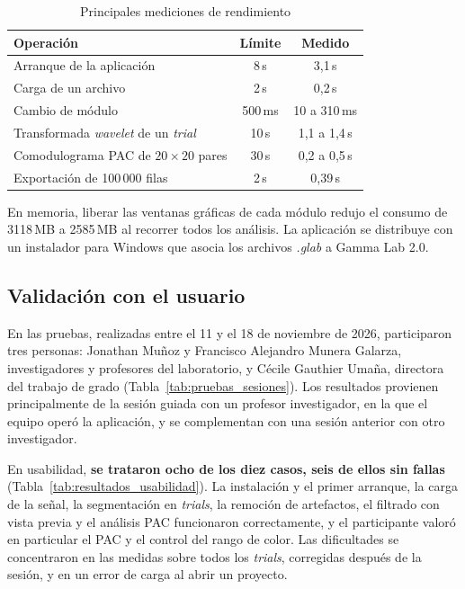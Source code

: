 \documentclass[12pt,letterpaper,oneside]{article}
\begin{document}
\begin{table}[H]
\centering
\scriptsize
\renewcommand{\arraystretch}{1.3}
\begin{tabularx}{\textwidth}{|>{\raggedright\arraybackslash}X|c|c|}
\hline
\textbf{Operación} & \textbf{Límite} & \textbf{Medido} \\
\hline
Arranque de la aplicación & 8\,s & 3,1\,s \\
\hline
Carga de un archivo & 2\,s & 0,2\,s \\
\hline
Cambio de módulo & 500\,ms & 10 a 310\,ms \\
\hline
Transformada \textit{wavelet} de un \textit{trial} & 10\,s & 1,1 a 1,4\,s \\
\hline
Comodulograma PAC de $20\times20$ pares & 30\,s & 0,2 a 0,5\,s \\
\hline
Exportación de 100\,000 filas & 2\,s & 0,39\,s \\
\hline
\end{tabularx}
\caption{Principales mediciones de rendimiento}
\label{tab:resultados_rendimiento}
\end{table}

En memoria, liberar las ventanas gráficas de cada módulo redujo el consumo de 3118\,MB a 2585\,MB al recorrer todos los análisis. La aplicación se distribuye con un instalador para Windows que asocia los archivos \textit{.glab} a Gamma Lab 2.0.

\subsection{Validación con el usuario}

En las pruebas, realizadas entre el 11 y el 18 de noviembre de 2026, participaron tres personas: Jonathan Muñoz y Francisco Alejandro Munera Galarza, investigadores y profesores del laboratorio, y Cécile Gauthier Umaña, directora del trabajo de grado (Tabla~\ref{tab:pruebas_sesiones}). Los resultados provienen principalmente de la sesión guiada con un profesor investigador, en la que el equipo operó la aplicación, y se complementan con una sesión anterior con otro investigador.

En usabilidad, \textbf{se trataron ocho de los diez casos, seis de ellos sin fallas} (Tabla~\ref{tab:resultados_usabilidad}). La instalación y el primer arranque, la carga de la señal, la segmentación en \textit{trials}, la remoción de artefactos, el filtrado con vista previa y el análisis PAC funcionaron correctamente, y el participante valoró en particular el PAC y el control del rango de color. Las dificultades se concentraron en las medidas sobre todos los \textit{trials}, corregidas después de la sesión, y en un error de carga al abrir un proyecto.
\end{document}
